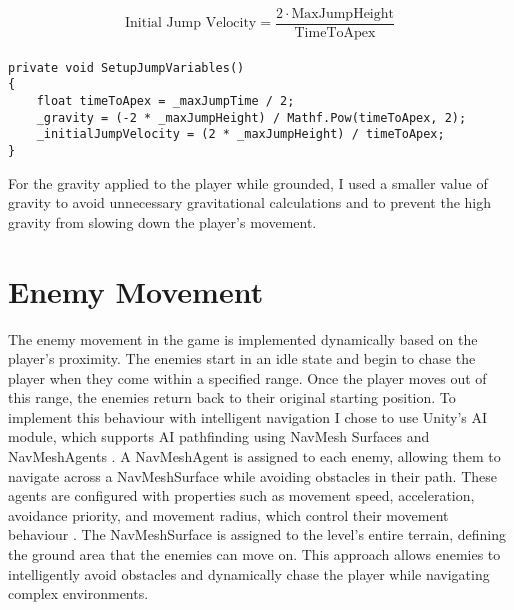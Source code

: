 \documentclass[]{final_report}
\begin{document}
\begin{equation}
\text{Initial Jump Velocity} = \frac{2 \cdot \text{MaxJumpHeight}}{\text{TimeToApex}}
\end{equation}
\paragraph{}
\begin{verbatim}
private void SetupJumpVariables()
{
    float timeToApex = _maxJumpTime / 2;
    _gravity = (-2 * _maxJumpHeight) / Mathf.Pow(timeToApex, 2);
    _initialJumpVelocity = (2 * _maxJumpHeight) / timeToApex;
}
\end{verbatim}
For the gravity applied to the player while grounded, I used a smaller value of gravity to avoid unnecessary gravitational calculations and to prevent the high gravity from slowing down the player's movement. \newline

\section{Enemy Movement}
The enemy movement in the game is implemented dynamically based on the player's proximity. The enemies start in an idle state and begin to chase the player when they come within a specified range. Once the player moves out of this range, the enemies return back to their original starting position. To implement this behaviour with intelligent navigation I chose to use Unity's AI module, which supports AI pathfinding using NavMesh Surfaces and NavMeshAgents \cite{unity2024_AI}. 
A NavMeshAgent is assigned to each enemy, allowing them to navigate across a NavMeshSurface while avoiding obstacles in their path. These agents are configured with properties such as movement speed, acceleration, avoidance priority, and movement radius, which control their movement behaviour \cite{unity2024_NavAgent}. The NavMeshSurface is assigned to the level's entire terrain, defining the ground area that the enemies can move on. This approach allows enemies to intelligently avoid obstacles and dynamically chase the player while navigating complex environments. \newline
\end{document}
